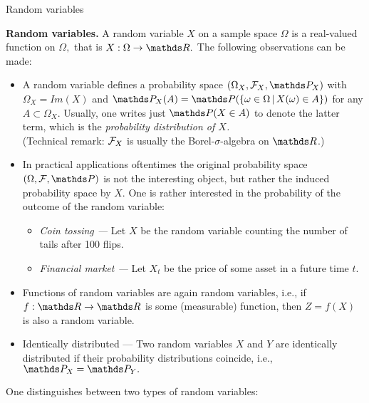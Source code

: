 \begin{vbframe}{Random variables}  
 
 \textbf{Random variables.} A random variable $X$ on a sample space $\Omega$ is a real-valued function on $\Omega,$ that is $X:\Omega \to \R.$ The following observations can be made:
 \begin{itemize}
 	\item 	A random variable defines a probability space $(\Omega_X,\F_X,\P_X)$ with $\Omega_X= Im(X)$ and $\P_X(A)=\P(\{\omega\in\Omega \, | \, X(\omega) \in A \})$ for any $A\subset \Omega_X.$ Usually, one writes just $\P(X\in A)$ to denote the latter term, which is the \emph{probability distribution of $X$.}\\
 	
 	{\tiny (Technical remark: $\mathcal{F}_X$ is usually the Borel-$\sigma$-algebra on $\R$.)}
 	\item In practical applications oftentimes the original probability space $(\Omega,\F,\P)$ is not the interesting object, but rather the induced probability space by $X.$ 
 	One is rather interested in the probability of the outcome of the random variable:
 	\begin{itemize}
 		\item \emph{Coin tossing ---} Let $X$ be the random variable counting the number of tails after 100 flips.
 		\item \emph{Financial market ---} Let $X_t$ be the  price of some asset in a future time $t.$
 	\end{itemize}
 	\framebreak
 	\item Functions of random variables are again random variables, i.e., if $f:\R \to \R$ is some (measurable) function, then $Z=f(X)$ is also a random variable.\\
 	\item Identically distributed --- Two random variables $X$ and $Y$ are identically distributed if their probability distributions coincide, i.e., $\P_X = \P_Y.$ 
 \end{itemize}
 One distinguishes between two types of random variables:
 \begin{itemize}
 	

\end{itemize}
\end{vbframe}
